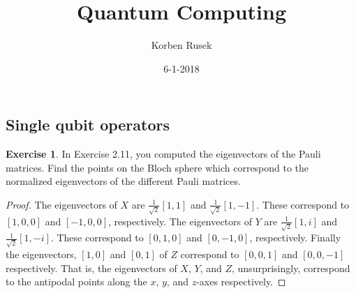 \documentclass{article}
\author{Korben Rusek}
\title{Quantum Computing}
\date{6-1-2018}
\begin{document}
  \maketitle
  \newcommand{\gindex}[2]{|#1\!:\!#2|}
  \newcommand{\lcm}{\textrm{lcm}}
  \newcommand{\irr}{\textrm{irr}}
  \newcommand{\sylp}{$Syl_{p}$}
  \newcommand{\phnt}[1]{$\phantom{1}^{#1}$}
  \newcommand{\gen}[1]{\langle#1\rangle}
  \newcommand{\BN}{\mathbb{N}}
  \newcommand{\BZ}{\mathbb{Z}}
  \newcommand{\BQ}{\mathbb{Q}}
  \newcommand{\BR}{\mathbb{R}}
  \newcommand{\BC}{\mathbb{C}}
  \newcommand{\BF}{\mathbb{F}}
  \newcommand{\CF}{\mathcal{F}}
  \newcommand{\CQ}{\mathcal{Q}}
  \newcommand{\fa}{\mathfrak{a}}
  \newcommand{\fb}{\mathfrak{b}}
  \newcommand{\fp}{\mathfrak{p}}
  \newcommand{\fq}{\mathfrak{q}}
  \newcommand{\fm}{\mathfrak{m}}
  \newcommand{\FN}{\mathfrak{N}}
  \newcommand{\FR}{\mathfrak{R}}
  \newcommand{\set}[1]{\{#1\}}
  \newcommand{\trv}{\set{1}}
  \newcommand{\Aut}{\mathrm{Aut}}
  \newcommand{\End}{\mathrm{End}}
  \newcommand{\Ker}{\mathrm{Ker}}
  \newcommand{\chr}{\mathrm{char}}

  \theoremstyle{definition}
  \newtheorem{theorem}{Theorem}[section]
  \newtheorem{corollary}[theorem]{Corollary}
  \newtheorem{definition}[theorem]{Definition}
  \newtheorem{lemma}[theorem]{Lemma}
  \newtheorem{exercise}{Exercise}[section]

  \setcounter{section}{4}
  \setcounter{subsection}{1}

\subsection{Single qubit operators}

\begin{exercise}
  In Exercise 2.11, you computed the eigenvectors of the Pauli matrices. Find the points on the Bloch sphere which correspond to the normalized eigenvectors of the different Pauli matrices.\label{ex:pauli-coordinates}
  \begin{proof}
    The eigenvectors of $X$ are $\frac{1}{\sqrt{2}}[1,1]$ and $\frac{1}{\sqrt{2}}[1,-1]$. These correspond to $[1,0,0]$ and $[-1,0,0]$, respectively. The eigenvectors of $Y$ are $\frac{1}{\sqrt2}[1,i]$ and $\frac{1}{\sqrt2}[1,-i]$. These correspond to $[0,1,0]$ and $[0,-1,0]$, respectively. Finally the eigenvectors, $[1,0]$ and $[0,1]$ of $Z$ correspond to $[0,0,1]$ and $[0,0,-1]$ respectively. That is, the eigenvectors of $X$, $Y$, and $Z$, unsurprisingly, correspond to the
    antipodal points along the $x$, $y$, and $z$-axes respectively.
  \end{proof}
\end{exercise}
\end{document}

